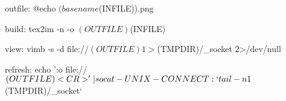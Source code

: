 outfile:
	@echo $(basename $(INFILE)).png

build:
	tex2im -n -o $(OUTFILE) $(INFILE)

view:
	vimb -s -d file://$(OUTFILE) 1>$(TMPDIR)/_socket 2>/dev/null

refresh:
	echo ':o file://$(OUTFILE)<CR>' | socat - UNIX-CONNECT:`tail -n 1 $(TMPDIR)/_socket`

